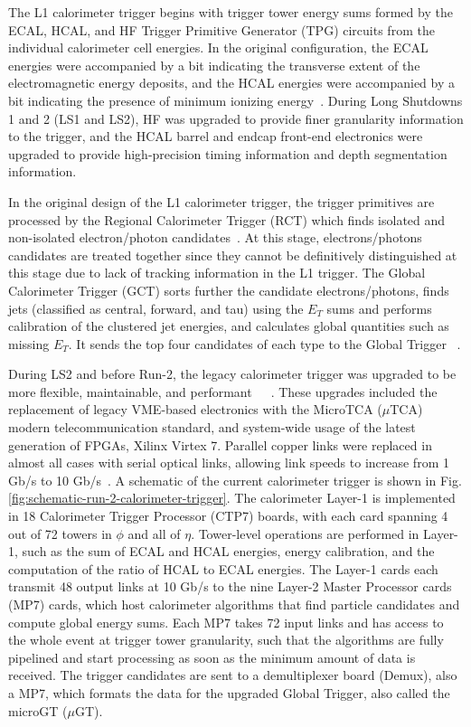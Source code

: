 The L1 calorimeter trigger begins with trigger tower energy sums formed by the ECAL, HCAL, and HF Trigger Primitive Generator (TPG) circuits from the individual calorimeter cell energies. In the original configuration, the ECAL energies were accompanied by a bit indicating the transverse extent of the electromagnetic energy deposits, and the HCAL energies were accompanied by a bit indicating the presence of minimum ionizing energy~\cite{CERN-LHCC-2000-038}. During Long Shutdowns 1 and 2 (LS1 and LS2), HF was upgraded to provide finer granularity information to the trigger, and the HCAL barrel and endcap front-end electronics were upgraded to provide high-precision timing information and depth segmentation information. 

In the original design of the L1 calorimeter trigger, the trigger primitives are processed by the Regional Calorimeter Trigger (RCT) which finds isolated and non-isolated electron/photon candidates~\cite{CMS-TDR-012}. At this stage, electrons/photons candidates are treated together since they cannot be definitively distinguished at this stage due to lack of tracking information in the L1 trigger. The Global Calorimeter Trigger (GCT) sorts further the candidate electrons/photons, finds jets (classified as central, forward, and tau) using the $E_T$ sums and performs calibration of the clustered jet energies, and calculates global quantities such as missing $E_T$. It sends the top four candidates of each type to the Global Trigger ~\cite{CMS-TDR-012}. 

During LS2 and before Run-2, the legacy calorimeter trigger was upgraded to be more flexible, maintainable, and performant~\cite{CMS-CR-2016-303}~\cite{JINST_Level-1-Calo-Trigger_2017}~\cite{Klabbers:2013cka}. These upgrades included the replacement of legacy VME-based electronics with the MicroTCA ($\mu$TCA) modern telecommunication standard, and system-wide usage of the latest generation of FPGAs, Xilinx Virtex 7. Parallel copper links were replaced in almost all cases with serial optical links, allowing link speeds to increase from 1 Gb/s to 10 Gb/s~\cite{CMS-CR-2016-303}. A schematic of the current calorimeter trigger is shown in Fig. \ref{fig:schematic-run-2-calorimeter-trigger}. The calorimeter Layer-1 is implemented in 18 Calorimeter Trigger Processor (CTP7) boards, with each card spanning 4 out of 72 towers in $\phi$ and all of $\eta$. Tower-level operations are performed in Layer-1, such as the sum of ECAL and HCAL energies, energy calibration, and the computation of the ratio of HCAL to ECAL energies. The Layer-1 cards each transmit 48 output links at 10 Gb/s to the nine Layer-2 Master Processor cards (MP7) cards, which host calorimeter algorithms that find particle candidates and compute global energy sums. Each MP7 takes 72 input links and has access to the whole event at trigger tower granularity, such that the algorithms are fully pipelined and start processing as soon as the minimum amount of data is received. The trigger candidates are sent to a demultiplexer board (Demux), also a MP7, which formats the data for the upgraded Global Trigger, also called the microGT ($\mu$GT). 

